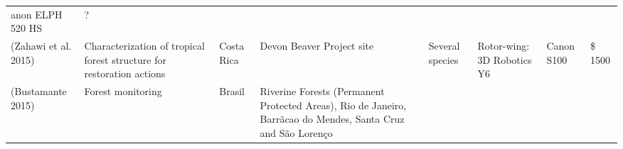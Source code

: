 \documentclass[]{interact}
\theoremstyle{plain}%
\theoremstyle{definition}
\theoremstyle{remark}
\begin{document}
\begin{longtable}[]{@{}llllllll@{}}
\begin{minipage}[t]{0.11\columnwidth}
anon ELPH 520 HS\strut
\end{minipage} & \begin{minipage}[t]{0.01\columnwidth}\raggedright\strut
?\strut
\end{minipage}\tabularnewline
\begin{minipage}[t]{0.11\columnwidth}\raggedright\strut
(Zahawi et al. 2015)\strut
\end{minipage} & \begin{minipage}[t]{0.18\columnwidth}\raggedright\strut
Characterization of tropical forest structure for restoration
actions\strut
\end{minipage} & \begin{minipage}[t]{0.03\columnwidth}\raggedright\strut
Costa Rica\strut
\end{minipage} & \begin{minipage}[t]{0.14\columnwidth}\raggedright\strut
Devon Beaver Project site\strut
\end{minipage} & \begin{minipage}[t]{0.10\columnwidth}\raggedright\strut
Several species\strut
\end{minipage} & \begin{minipage}[t]{0.09\columnwidth}\raggedright\strut
Rotor-wing: 3D Robotics Y6\strut
\end{minipage} & \begin{minipage}[t]{0.11\columnwidth}\raggedright\strut
Canon S100\strut
\end{minipage} & \begin{minipage}[t]{0.01\columnwidth}\raggedright\strut
\$ 1500\strut
\end{minipage}\tabularnewline
\begin{minipage}[t]{0.11\columnwidth}\raggedright\strut
(Bustamante 2015)\strut
\end{minipage} & \begin{minipage}[t]{0.18\columnwidth}\raggedright\strut
Forest monitoring\strut
\end{minipage} & \begin{minipage}[t]{0.03\columnwidth}\raggedright\strut
Brasil\strut
\end{minipage} & \begin{minipage}[t]{0.14\columnwidth}\raggedright\strut
Riverine Forests (Permanent Protected Areas), Rio de Janeiro, Barrãcao
do Mendes, Santa Cruz and São Lorenço\strut
\end{minipage} & \begin{minipage}[t]{0.10\columnwidth}\raggedright\strut

\end{minipage}
\end{longtable}
\end{document}
